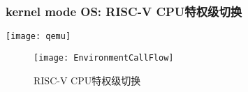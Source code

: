 




\begin{frame}
	\frametitle{kernel mode OS: RISC-V CPU特权级切换}
	\centering
	\texttt{[image: qemu]}
	
%		
%
\begin{figure}
	\centering
    \texttt{[image: EnvironmentCallFlow]}
    	\caption{RISC-V CPU特权级切换}
    \end{figure}	
\end{frame}

